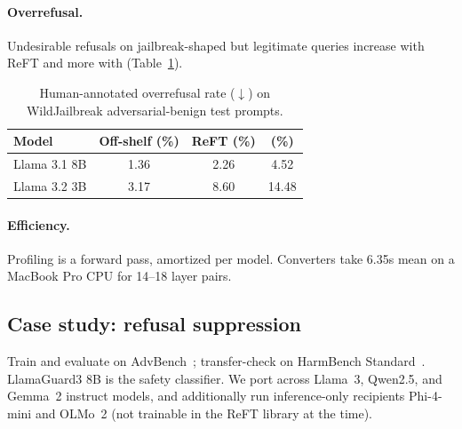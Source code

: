 
\paragraph{Overrefusal.}
Undesirable refusals on jailbreak-shaped but legitimate queries increase with ReFT and more with \cmdv{} (Table~\ref{tab:overrefusal}).

\begin{table}[t]
\centering
\caption{Human-annotated overrefusal rate ($\downarrow$) on WildJailbreak adversarial-benign test prompts.}
\label{tab:overrefusal}
\begin{tabular}{lccc}
\toprule
Model & Off-shelf (\%) & ReFT (\%) & \cmdv{} (\%) \\
\midrule
Llama 3.1 8B & 1.36 & 2.26 & 4.52 \\
Llama 3.2 3B & 3.17 & 8.60 & 14.48 \\
\bottomrule
\end{tabular}
\end{table}


\paragraph{Efficiency.}
Profiling is a forward pass, amortized per model.
Converters take 6.35s mean on a MacBook Pro CPU for 14--18 layer pairs.

\subsection{Case study: refusal suppression}

Train and evaluate on AdvBench~\cite{zou2023advbench}; transfer-check on HarmBench Standard~\cite{mazeika2024}.
LlamaGuard3 8B is the safety classifier.
We port across Llama~3, Qwen2.5, and Gemma~2 instruct models, and additionally run inference-only recipients Phi-4-mini and OLMo~2 (not trainable in the ReFT library at the time).


